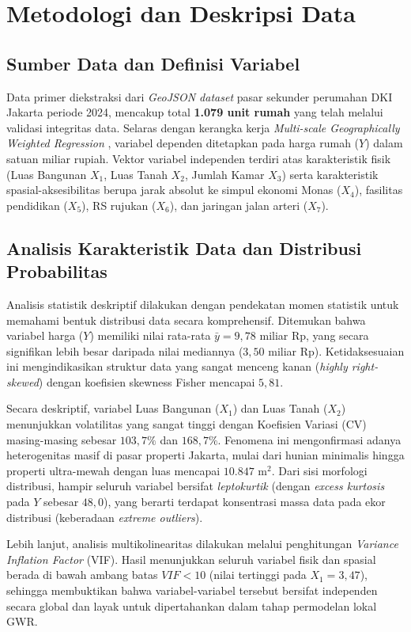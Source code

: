\documentclass[10pt,journal]{IEEEtran}
\begin{document}
\section{Metodologi dan Deskripsi Data}

\subsection{Sumber Data dan Definisi Variabel}
Data primer diekstraksi dari \textit{GeoJSON dataset} pasar sekunder perumahan DKI Jakarta periode 2024, mencakup total \textbf{1.079 unit rumah} yang telah melalui validasi integritas data. Selaras dengan kerangka kerja \textit{Multi-scale Geographically Weighted Regression} \cite{mgwr2019}, variabel dependen ditetapkan pada harga rumah ($Y$) dalam satuan miliar rupiah. Vektor variabel independen terdiri atas karakteristik fisik (Luas Bangunan $X_1$, Luas Tanah $X_2$, Jumlah Kamar $X_3$) serta karakteristik spasial-aksesibilitas berupa jarak absolut ke simpul ekonomi Monas ($X_4$), fasilitas pendidikan ($X_5$), RS rujukan ($X_6$), dan jaringan jalan arteri ($X_7$).

\subsection{Analisis Karakteristik Data dan Distribusi Probabilitas}
Analisis statistik deskriptif dilakukan dengan pendekatan momen statistik untuk memahami bentuk distribusi data secara komprehensif. Ditemukan bahwa variabel harga ($Y$) memiliki nilai rata-rata $\bar{y} = 9,78$ miliar Rp, yang secara signifikan lebih besar daripada nilai mediannya ($3,50$ miliar Rp). Ketidaksesuaian ini mengindikasikan struktur data yang sangat menceng kanan (\textit{highly right-skewed}) dengan koefisien skewness Fisher mencapai $5,81$. 

Secara deskriptif, variabel Luas Bangunan ($X_1$) dan Luas Tanah ($X_2$) menunjukkan volatilitas yang sangat tinggi dengan Koefisien Variasi (CV) masing-masing sebesar $103,7\%$ dan $168,7\%$. Fenomena ini mengonfirmasi adanya heterogenitas masif di pasar properti Jakarta, mulai dari hunian minimalis hingga properti ultra-mewah dengan luas mencapai $10.847 \text{ m}^2$. Dari sisi morfologi distribusi, hampir seluruh variabel bersifat \textit{leptokurtik} (dengan \textit{excess kurtosis} pada $Y$ sebesar $48,0$), yang berarti terdapat konsentrasi massa data pada ekor distribusi (keberadaan \textit{extreme outliers}).

Lebih lanjut, analisis multikolinearitas dilakukan melalui penghitungan \textit{Variance Inflation Factor} (VIF). Hasil menunjukkan seluruh variabel fisik dan spasial berada di bawah ambang batas $VIF < 10$ (nilai tertinggi pada $X_1 = 3,47$), sehingga membuktikan bahwa variabel-variabel tersebut bersifat independen secara global dan layak untuk dipertahankan dalam tahap permodelan lokal GWR.
\end{document}
